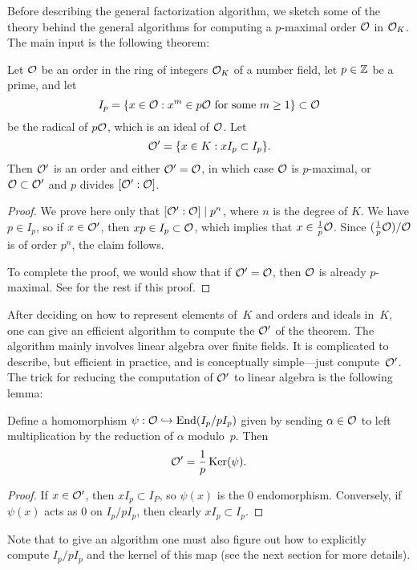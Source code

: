 Before describing the general factorization algorithm, we sketch some
of the theory behind the general algorithms for computing a
$p$-maximal order $\mathcal{O}$ in $\mathcal{O}_K$.  The main input is the following theorem:
\begin{theorem}
	Let $\mathcal{O}$ be an order in the ring of integers $\mathcal{O}_K$ of a number field,
	let $p\in\mathbb{Z}$ be a prime, and let
	$$
		I_p = \{x \in \mathcal{O} : x^m \in p\mathcal{O} \text{ for some $m\geq 1$}\} \subset \mathcal{O}
	$$
	be the radical of $p\mathcal{O}$, which is an ideal of $\mathcal{O}$. Let
	$$
		\mathcal{O}' = \{x \in K : xI_p \subset I_p\}.
	$$
	Then $\mathcal{O}'$ is an order and either $\mathcal{O}'=\mathcal{O}$, in which case $\mathcal{O}$ is
	$p$-maximal, or $\mathcal{O}\subset\mathcal{O}'$ and $p$ divides $[\mathcal{O}':\mathcal{O}]$.
\end{theorem}
\begin{proof}
	We prove here only that $[\mathcal{O}':\mathcal{O}] \mid p^n$, where $n$ is the degree
	of $K$.  We have $p\in I_p$, so if $x \in \mathcal{O}'$, then $xp \in
	I_p\subset \mathcal{O}$, which implies that $x\in \frac{1}{p}\mathcal{O}$.  Since
	$(\frac{1}{p}\mathcal{O})/\mathcal{O}$ is of order $p^n$, the claim follows.

	To complete the proof, we would show that if $\mathcal{O}' = \mathcal{O}$, then $\mathcal{O}$ is
	already $p$-maximal.  See \cite[\S6.1.1]{cohen:course_ant} for the
	rest if this proof.
\end{proof}

After deciding on how to represent elements of~$K$ and orders and
ideals in~$K$, one can give an efficient algorithm to compute the
$\mathcal{O}'$ of the theorem.  The algorithm mainly involves linear algebra
over finite fields.  It is complicated to describe, but efficient in
practice, and is conceptually simple---just compute~$\mathcal{O}'$.  The trick
for reducing the computation of $\mathcal{O}'$ to linear algebra is the
following lemma:
\begin{lemma}
	Define a homomorphism $\psi:\mathcal{O} \hookrightarrow \operatorname{End}(I_p/ p I_p)$ given by
	sending $\alpha\in\mathcal{O}$ to left multiplication by the reduction of
	$\alpha$ modulo~$p$.  Then
	$$
		\mathcal{O}'=\frac{1}{p} \operatorname{Ker}(\psi).
	$$
\end{lemma}
\begin{proof}
	If $x \in \mathcal{O}'$, then $x I_p \subset I_P$, so $\psi(x)$ is the $0$
	endomorphism.  Conversely, if $\psi(x)$ acts as $0$ on $I_p/ p I_p$,
	then clearly $x I_p \subset I_p$.
\end{proof}

Note that to give an algorithm one must also figure out how to
explicitly compute $I_p/ p I_p$ and the kernel of this map
(see  the next section for more
details).

